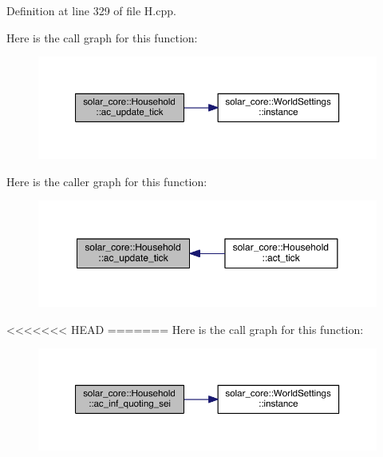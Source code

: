 Definition at line 329 of file H.\+cpp.



Here is the call graph for this function\+:\nopagebreak
\begin{figure}[H]
\begin{center}
\leavevmode
\includegraphics[width=350pt]{classsolar__core_1_1_household_ac73de13d0d4b4e01b2defbb85872c4b2_cgraph}
\end{center}
\end{figure}




Here is the caller graph for this function\+:\nopagebreak
\begin{figure}[H]
\begin{center}
\leavevmode
\includegraphics[width=350pt]{classsolar__core_1_1_household_ac73de13d0d4b4e01b2defbb85872c4b2_icgraph}
\end{center}
\end{figure}

<<<<<<< HEAD
=======
Here is the call graph for this function\+:
\nopagebreak
\begin{figure}[H]
\begin{center}
\leavevmode
\includegraphics[width=350pt]{classsolar__core_1_1_household_a165b7c64c72e5ed4ea08307e32082517_cgraph}
\end{center}
\end{figure}




